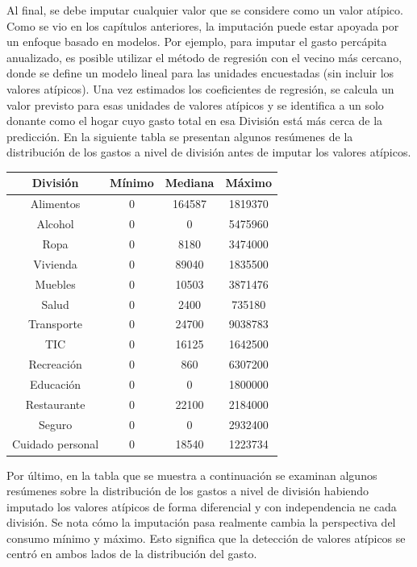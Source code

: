 \documentclass[
  12pt,
]{book}
\begin{document}
Al final, se debe imputar cualquier valor que se considere como un valor atípico. Como se vio en los capítulos anteriores, la imputación puede estar apoyada por un enfoque basado en modelos. Por ejemplo, para imputar el gasto percápita anualizado, es posible utilizar el método de regresión con el vecino más cercano, donde se define un modelo lineal para las unidades encuestadas (sin incluir los valores atípicos). Una vez estimados los coeficientes de regresión, se calcula un valor previsto para esas unidades de valores atípicos y se identifica a un solo donante como el hogar cuyo gasto total en esa División está más cerca de la predicción. En la siguiente tabla se presentan algunos resúmenes de la distribución de los gastos a nivel de división antes de imputar los valores atípicos.

\begin{longtable}[]{@{}cccc@{}}
\toprule()
División & Mínimo & Mediana & Máximo \\
\midrule()
\endhead
Alimentos & 0 & 164587 & 1819370 \\
Alcohol & 0 & 0 & 5475960 \\
Ropa & 0 & 8180 & 3474000 \\
Vivienda & 0 & 89040 & 1835500 \\
Muebles & 0 & 10503 & 3871476 \\
Salud & 0 & 2400 & 735180 \\
Transporte & 0 & 24700 & 9038783 \\
TIC & 0 & 16125 & 1642500 \\
Recreación & 0 & 860 & 6307200 \\
Educación & 0 & 0 & 1800000 \\
Restaurante & 0 & 22100 & 2184000 \\
Seguro & 0 & 0 & 2932400 \\
Cuidado personal & 0 & 18540 & 1223734 \\
\bottomrule()
\end{longtable}

Por último, en la tabla que se muestra a continuación se examinan algunos resúmenes sobre la distribución de los gastos a nivel de división habiendo imputado los valores atípicos de forma diferencial y con independencia ne cada división. Se nota cómo la imputación pasa realmente cambia la perspectiva del consumo mínimo y máximo. Esto significa que la detección de valores atípicos se centró en ambos lados de la distribución del gasto.
\end{document}
